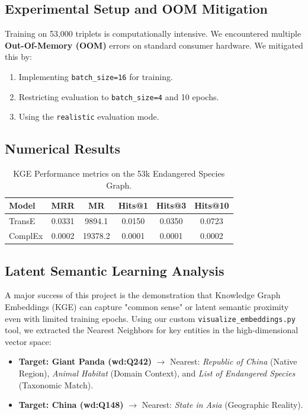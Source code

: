 \documentclass[11pt]{article}
\begin{document}
\subsection{Experimental Setup and OOM Mitigation}
Training on 53,000 triplets is computationally intensive. We encountered multiple \textbf{Out-Of-Memory (OOM)} errors on standard consumer hardware. We mitigated this by:
\begin{enumerate}
    \item Implementing \texttt{batch\_size=16} for training.
    \item Restricting evaluation to \texttt{batch\_size=4} and 10 epochs.
    \item Using the \texttt{realistic} evaluation mode.
\end{enumerate}

\subsection{Numerical Results}
\begin{table}[h!]
\centering
\begin{tabular}{@{}lccccc@{}}
\toprule
\textbf{Model} & \textbf{MRR} & \textbf{MR} & \textbf{Hits@1} & \textbf{Hits@3} & \textbf{Hits@10} \\ \midrule
TransE  & 0.0331 & 9894.1 & 0.0150 & 0.0350 & 0.0723 \\
ComplEx & 0.0002 & 19378.2 & 0.0001 & 0.0001 & 0.0002 \\ \bottomrule
\end{tabular}
\caption{KGE Performance metrics on the 53k Endangered Species Graph.}
\end{table}

\subsection{Latent Semantic Learning Analysis}
A major success of this project is the demonstration that Knowledge Graph Embeddings (KGE) can capture "common sense" or latent semantic proximity even with limited training epochs. Using our custom \texttt{visualize\_embeddings.py} tool, we extracted the Nearest Neighbors for key entities in the high-dimensional vector space:

\begin{itemize}
    \item \textbf{Target: Giant Panda (wd:Q242)} $\rightarrow$ Nearest: \textit{Republic of China} (Native Region), \textit{Animal Habitat} (Domain Context), and \textit{List of Endangered Species} (Taxonomic Match).
    \item \textbf{Target: China (wd:Q148)} $\rightarrow$ Nearest: \textit{State in Asia} (Geographic Reality).
\end{itemize}
\end{document}
